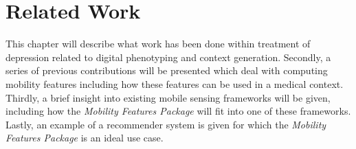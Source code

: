 \chapter{Related Work}
\label{chapter:02-related-work}
This chapter will describe what work has been done within treatment of depression related to digital phenotyping and context generation. Secondly, a series of previous contributions will be presented which deal with computing mobility features including how these features can be used in a medical context. Thirdly, a brief insight into existing mobile sensing frameworks will be given, including how the \textit{Mobility Features Package} will fit into one of these frameworks. Lastly, an example of a recommender system is given for which the \textit{Mobility Features Package} is an ideal use case.











